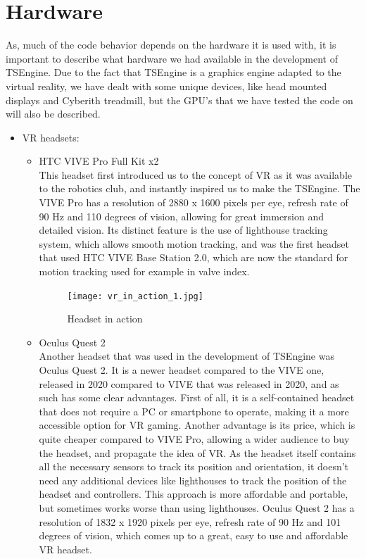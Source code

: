 \newpage
\section{Hardware}
\label{sec:hardware}
As, much of the code behavior depends on the hardware it is used with, it is important to describe what hardware we had available in the development of TSEngine.
Due to the fact that TSEngine is a graphics engine adapted to the virtual reality, we have dealt with some unique devices, like head mounted displays and Cyberith treadmill, but the GPU's that we have tested the code on will also be described.
\begin{itemize}
    \item VR headsets:
    \begin{itemize}
        \item HTC VIVE Pro Full Kit x2\\
        This headset first introduced us to the concept of VR as it was available to the robotics club, and instantly inspired us to make the TSEngine. The VIVE Pro has a resolution of 2880 x 1600 pixels per eye, refresh rate of 90 Hz and 110 degrees of vision, allowing for great immersion and detailed vision. Its distinct feature is the use of lighthouse tracking system, which allows smooth motion tracking, and was the first headset that used HTC VIVE Base Station 2.0, which are now the standard for motion tracking used for example in valve index.
        \begin{figure}[H] %
        \begin{center}
         \texttt{[image: vr\_in\_action\_1.jpg]}           
        \end{center}
         \caption{Headset in action}
        \end{figure}
        \item Oculus Quest 2\\
        Another headset that was used in the development of TSEngine was Oculus Quest 2. It is a newer headset compared to the VIVE one, released in 2020 compared to VIVE that was released in 2020, and as such has some clear advantages. First of all, it is a self-contained headset that does not require a PC or smartphone to operate, making it a more accessible option for VR gaming. Another advantage is its price, which is quite cheaper compared to VIVE Pro, allowing a wider audience to buy the headset, and propagate the idea of VR. As the headset itself contains all the necessary sensors to track its position and orientation, it doesn't need any additional devices like lighthouses to track the position of the headset and controllers. This approach is more affordable and portable, but sometimes works worse than using lighthouses. Oculus Quest 2 has a resolution of 1832 x 1920 pixels per eye, refresh rate of 90 Hz and 101 degrees of vision, which comes up to a great, easy to use and affordable VR headset.

\end{itemize}
\end{itemize}
